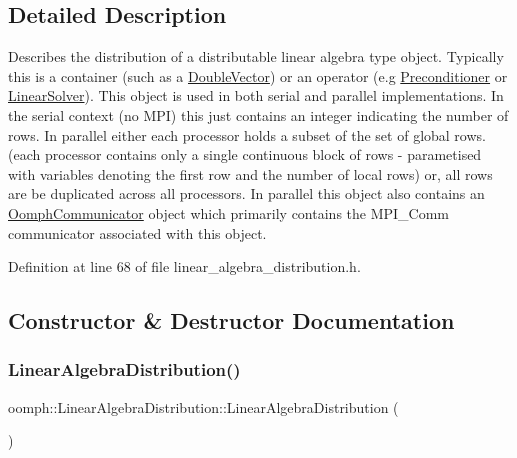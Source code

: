 \subsection{Detailed Description}
Describes the distribution of a distributable linear algebra type object. Typically this is a container (such as a \hyperlink{classoomph_1_1DoubleVector}{Double\+Vector}) or an operator (e.\+g \hyperlink{classoomph_1_1Preconditioner}{Preconditioner} or \hyperlink{classoomph_1_1LinearSolver}{Linear\+Solver}). This object is used in both serial and parallel implementations. In the serial context (no M\+PI) this just contains an integer indicating the number of rows. In parallel either each processor holds a subset of the set of global rows. (each processor contains only a single continuous block of rows -\/ parametised with variables denoting the first row and the number of local rows) or, all rows are be duplicated across all processors. In parallel this object also contains an \hyperlink{classoomph_1_1OomphCommunicator}{Oomph\+Communicator} object which primarily contains the M\+P\+I\+\_\+\+Comm communicator associated with this object. 

Definition at line 68 of file linear\+\_\+algebra\+\_\+distribution.\+h.



\subsection{Constructor \& Destructor Documentation}
\mbox{\label{classoomph_1_1LinearAlgebraDistribution_ad1f6bbede398679d0e257abebae17951}} 
\subsubsection{\texorpdfstring{Linear\+Algebra\+Distribution()}{LinearAlgebraDistribution()}\hspace{0.1cm}{\footnotesize\ttfamily [1/7]}}
{\footnotesize\ttfamily oomph\+::\+Linear\+Algebra\+Distribution\+::\+Linear\+Algebra\+Distribution (\begin{DoxyParamCaption}{ }\end{DoxyParamCaption})\hspace{0.3cm}{\ttfamily [inline]}}



